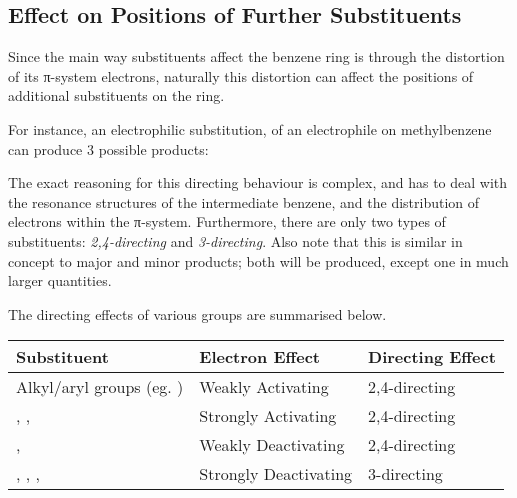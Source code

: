 		\subsection{Effect on Positions of Further Substituents}

			Since the main way substituents affect the benzene ring is through the distortion of its π-system electrons, naturally
			this distortion can affect the positions of additional substituents on the ring.

			For instance, an electrophilic substitution, of an electrophile  on methylbenzene can produce 3 possible products:


			The exact reasoning for this directing behaviour is complex, and has to deal with the resonance structures of the intermediate
			benzene, and the distribution of electrons within the π-system. Furthermore, there are only two types of substituents:
			\textit{2,4-directing} and \textit{3-directing}. Also note that this is similar in concept to major and minor products; both
			will be produced, except one in much larger quantities.

			The directing effects of various groups are summarised below.


			\begin{center}\begin{table}[htb]\renewcommand{\arraystretch}{1.5}
			\begin{tabu} to \textwidth {| X[-4,c,m] | X[c,m] | X[c,m] |}

				\hline
							Substituent						&	Electron Effect			&	Directing Effect	\\	\hline
				Alkyl/aryl groups (eg. )			&	Weakly Activating		&	2,4-directing		\\	\hline
				, , 				&	Strongly Activating		&	2,4-directing		\\	\hline
				\ch{-\chlorine}, 					&	Weakly Deactivating		&	2,4-directing		\\	\hline
				, , , 	&	Strongly Deactivating	&	3-directing			\\	\hline

			\end{tabu}
			\end{table}\end{center}\vspace{-10mm}


